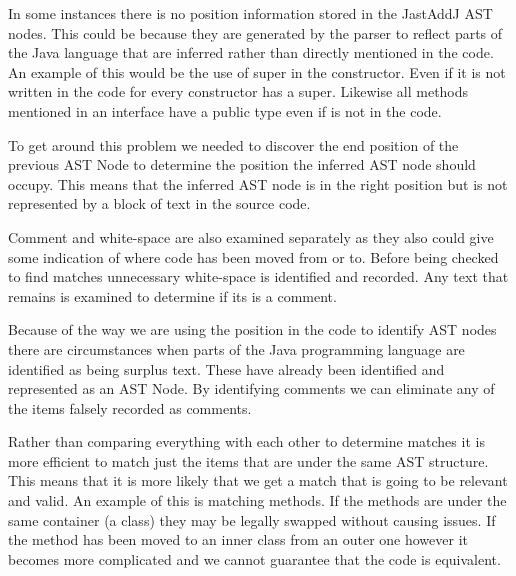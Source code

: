 
In some instances there is no position information stored in the JastAddJ AST nodes.  This could be because they are generated by the parser to reflect parts of the Java language that are inferred rather than directly mentioned in the code.  An example of this would be the use of super in the constructor.  Even if it is not written in the code for every constructor has a super. Likewise all methods mentioned in an interface have a public type even if is not in the code.

To get around this problem we needed to discover the end position of the previous AST Node to determine the position the inferred AST node should occupy.  This means that the inferred AST node is in the right position but is not represented by a block of text in the source code. 

Comment and white-space are also examined separately as they also could give some indication of where code has been moved from or to.
Before being checked to find matches unnecessary white-space is identified and recorded.
Any text that remains is examined to determine if its is a comment. 

Because of the way we are using the position in the code to identify AST nodes there are circumstances when parts of the Java programming language are identified as being surplus text. These have already been identified and represented as an AST Node. By identifying comments we can eliminate any of the items falsely recorded as comments.


% 
% 

Rather than comparing everything with each other to determine matches it is more efficient to match just the items that are under the same AST structure.  This means that it is more likely that we get a match that is going to be relevant and valid.  An example of this is matching methods. If the methods are under the same container (a class) they may be legally swapped without causing issues.  If the method has been moved to an inner class from an outer one however it becomes more complicated and we cannot guarantee that the code is equivalent.  

